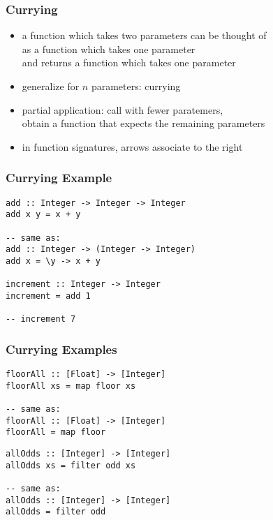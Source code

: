 \documentclass[dvipsnames]{beamer}
\theoremstyle{plain}
\begin{document}
\begin{frame}
  \frametitle{Currying}

  \begin{itemize}
    \item a function which takes two parameters can be thought of\\
      as a function which takes one parameter\\
      and returns a function which takes one parameter
    \item generalize for $n$ parameters: \alert{currying}

    \pause
    \bigskip
    \item \alert{partial application}: call with fewer paratemers,\\
      obtain a function that expects the remaining parameters

    \item in function signatures, arrows associate to the right
  \end{itemize}
\end{frame}

\begin{frame}[fragile]
  \frametitle{Currying Example}

  \begin{exampleblock}{}
    \begin{lstlisting}
add :: Integer -> Integer -> Integer
add x y = x + y

-- same as:
add :: Integer -> (Integer -> Integer)
add x = \y -> x + y

increment :: Integer -> Integer
increment = add 1

-- increment 7
    \end{lstlisting}
  \end{exampleblock}
\end{frame}

\begin{frame}[fragile]
  \frametitle{Currying Examples}

  \begin{exampleblock}{}
    \begin{lstlisting}
floorAll :: [Float] -> [Integer]
floorAll xs = map floor xs

-- same as:
floorAll :: [Float] -> [Integer]
floorAll = map floor
    \end{lstlisting}
  \end{exampleblock}

  \begin{exampleblock}{}
    \begin{lstlisting}
allOdds :: [Integer] -> [Integer]
allOdds xs = filter odd xs

-- same as:
allOdds :: [Integer] -> [Integer]
allOdds = filter odd
    \end{lstlisting}
  \end{exampleblock}
\end{frame}
\end{document}
